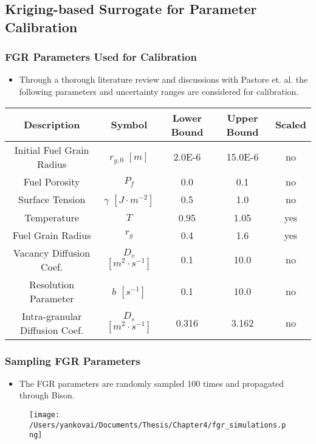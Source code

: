 \subsection{Kriging-based Surrogate for Parameter Calibration}

\begin{frame}
\frametitle{FGR Parameters Used for Calibration}

\begin{itemize}
  \item Through a thorough literature review and discussions with Pastore et. al. the following parameters and uncertainty ranges are considered for calibration.
\end{itemize}

\begin{table} 
\tiny
\centering
\begin{tabular}{||c|c|c|c|c||} 
\hline \hline
\textbf{Description} & \textbf{Symbol} & \textbf{Lower Bound} & \textbf{Upper Bound} & \textbf{Scaled} \\ \hline
Initial Fuel Grain Radius & $r_{g,0}$  $\left[ m\right]$  & 2.0E-6 & 15.0E-6 & no \\ \hline
Fuel Porosity               & $P_f$      & 0.0      & 0.1      & no \\ \hline
Surface Tension           & $\gamma$  $\left[ J\cdot m^{-2}\right]$ & 0.5     & 1.0      & no \\ \hline
Temperature               & $T$          & 0.95   & 1.05     & yes \\ \hline
Fuel Grain Radius         & $r_g$       & 0.4     & 1.6      & yes \\ \hline
Vacancy Diffusion Coef.  & $D_v$ $\left[ m^{2}\cdot s^{-1}\right]$      & 0.1      & 10.0     & no \\ \hline
Resolution Parameter    & $b$ $\left[ s^{-1}\right]$        & 0.1      & 10.0     & no \\ \hline
Intra-granular Diffusion Coef. & $D_s$  $\left[ m^{2}\cdot s^{-1}\right]$ & 0.316 & 3.162   & no \\ 
\hline \hline
\end{tabular}
\end{table}

\end{frame}
\begin{frame}
\frametitle{Sampling FGR Parameters}

\begin{itemize}
  \item The FGR parameters are randomly sampled 100 times and propagated through Bison.
\end{itemize}

\begin{figure}
  \texttt{[image: /Users/yankovai/Documents/Thesis/Chapter4/fgr\_simulations.png]}
\end{figure}

\end{frame}
